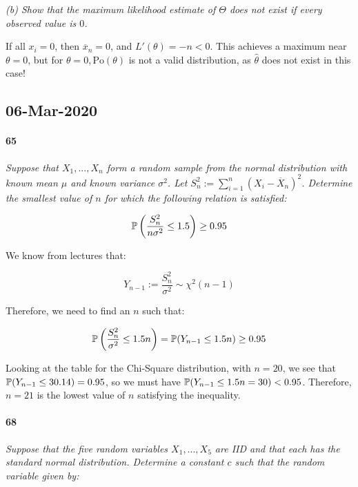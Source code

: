 \documentclass[a4paper]{article}
\begin{document}
            \textit{(b) Show that the maximum likelihood estimate of $\Theta$
            does not exist if every observed value is $0$.}

                If all $x_i = 0$, then $\overline x_n = 0$, and $L'(\theta) = -n
                < 0$. This achieves a maximum near $\theta = 0$, but for $\theta
                = 0, \text{Po}(\theta)$ is not a valid distribution, as
                $\widehat \theta$ does not exist in this case!

        \subsection*{06-Mar-2020}
            \paragraph{65}
            \textit{Suppose that $X_1, ..., X_n$ form a random sample from the
            normal distribution with known mean $\mu$ and known variance
            $\sigma^2$. Let $S_n^2 := \sum\limits_{i=1}^n (X_i - \overline
            X_n)^2$. Determine the smallest value of $n$ for which the following
            relation is satisfied:}

            \[
                \mathbb{P}\left(\frac{S_n^2}{n\sigma^2} \leq 1.5\right) \geq 0.95
            \]

                We know from lectures that:

                \[
                    Y_{n-1} := \frac{S_n^2}{\sigma^2} \sim \chi^2(n - 1)
                \]

                Therefore, we need to find an $n$ such that:

                \[
                    \mathbb{P}\left(\frac{S_n^2}{\sigma^2} \leq 1.5n\right) =
                    \mathbb{P}(Y_{n-1} \leq 1.5n) \geq 0.95
                \]

                Looking at the table for the Chi-Square distribution, with $n =
                20$, we see that $\mathbb{P}(Y_{n-1} \leq 30.14) = 0.95$, so we must
                have $\mathbb{P}(Y_{n-1} \leq 1.5n = 30) < 0.95$. Therefore, $n =
                21$ is the lowest value of $n$ satisfying the inequality.

            \paragraph{68}
            \textit{Suppose that the five random variables $X_1, ..., X_5$ are
            IID and that each has the standard normal distribution. Determine a
            constant $c$ such that the random variable given by:}
\end{document}
